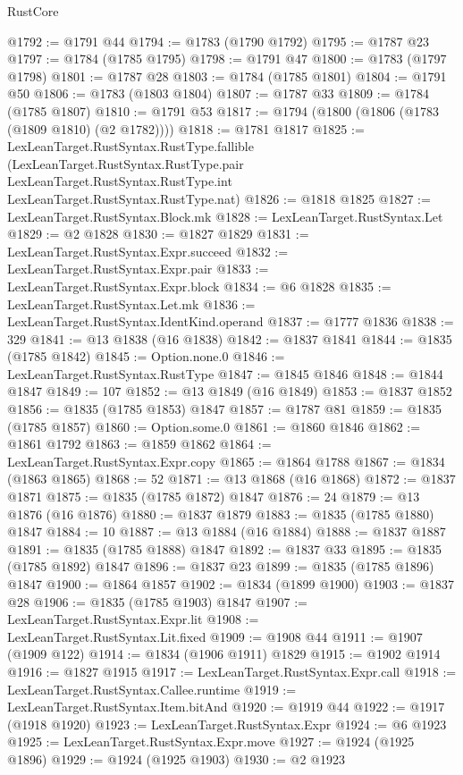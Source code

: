 \begin{lexlean}{RustCore}
\begin{coremodule}
@1792 := @1791 @44
@1794 := @1783 (@1790 @1792)
@1795 := @1787 @23
@1797 := @1784 (@1785 @1795)
@1798 := @1791 @47
@1800 := @1783 (@1797 @1798)
@1801 := @1787 @28
@1803 := @1784 (@1785 @1801)
@1804 := @1791 @50
@1806 := @1783 (@1803 @1804)
@1807 := @1787 @33
@1809 := @1784 (@1785 @1807)
@1810 := @1791 @53
@1817 := @1794 (@1800 (@1806 (@1783 (@1809 @1810) (@2 @1782))))
@1818 := @1781 @1817
@1825 := LexLeanTarget.RustSyntax.RustType.fallible
    (LexLeanTarget.RustSyntax.RustType.pair
      LexLeanTarget.RustSyntax.RustType.int
      LexLeanTarget.RustSyntax.RustType.nat)
@1826 := @1818 @1825
@1827 := LexLeanTarget.RustSyntax.Block.mk
@1828 := LexLeanTarget.RustSyntax.Let
@1829 := @2 @1828
@1830 := @1827 @1829
@1831 := LexLeanTarget.RustSyntax.Expr.succeed
@1832 := LexLeanTarget.RustSyntax.Expr.pair
@1833 := LexLeanTarget.RustSyntax.Expr.block
@1834 := @6 @1828
@1835 := LexLeanTarget.RustSyntax.Let.mk
@1836 := LexLeanTarget.RustSyntax.IdentKind.operand
@1837 := @1777 @1836
@1838 := 329
@1841 := @13 @1838 (@16 @1838)
@1842 := @1837 @1841
@1844 := @1835 (@1785 @1842)
@1845 := Option.none.{0}
@1846 := LexLeanTarget.RustSyntax.RustType
@1847 := @1845 @1846
@1848 := @1844 @1847
@1849 := 107
@1852 := @13 @1849 (@16 @1849)
@1853 := @1837 @1852
@1856 := @1835 (@1785 @1853) @1847
@1857 := @1787 @81
@1859 := @1835 (@1785 @1857)
@1860 := Option.some.{0}
@1861 := @1860 @1846
@1862 := @1861 @1792
@1863 := @1859 @1862
@1864 := LexLeanTarget.RustSyntax.Expr.copy
@1865 := @1864 @1788
@1867 := @1834 (@1863 @1865)
@1868 := 52
@1871 := @13 @1868 (@16 @1868)
@1872 := @1837 @1871
@1875 := @1835 (@1785 @1872) @1847
@1876 := 24
@1879 := @13 @1876 (@16 @1876)
@1880 := @1837 @1879
@1883 := @1835 (@1785 @1880) @1847
@1884 := 10
@1887 := @13 @1884 (@16 @1884)
@1888 := @1837 @1887
@1891 := @1835 (@1785 @1888) @1847
@1892 := @1837 @33
@1895 := @1835 (@1785 @1892) @1847
@1896 := @1837 @23
@1899 := @1835 (@1785 @1896) @1847
@1900 := @1864 @1857
@1902 := @1834 (@1899 @1900)
@1903 := @1837 @28
@1906 := @1835 (@1785 @1903) @1847
@1907 := LexLeanTarget.RustSyntax.Expr.lit
@1908 := LexLeanTarget.RustSyntax.Lit.fixed
@1909 := @1908 @44
@1911 := @1907 (@1909 @122)
@1914 := @1834 (@1906 @1911) @1829
@1915 := @1902 @1914
@1916 := @1827 @1915
@1917 := LexLeanTarget.RustSyntax.Expr.call
@1918 := LexLeanTarget.RustSyntax.Callee.runtime
@1919 := LexLeanTarget.RustSyntax.Item.bitAnd
@1920 := @1919 @44
@1922 := @1917 (@1918 @1920)
@1923 := LexLeanTarget.RustSyntax.Expr
@1924 := @6 @1923
@1925 := LexLeanTarget.RustSyntax.Expr.move
@1927 := @1924 (@1925 @1896)
@1929 := @1924 (@1925 @1903)
@1930 := @2 @1923

\end{coremodule}
\end{lexlean}
